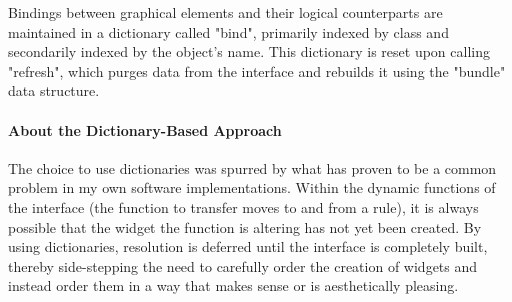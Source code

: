 Bindings between graphical elements and their logical counterparts
  are maintained in a dictionary called "bind", primarily indexed by class
  and secondarily indexed by the object's name.
This dictionary is reset upon calling "refresh",
  which purges data from the interface and rebuilds it using
  the "bundle" data structure.

\paragraph{About the Dictionary-Based Approach}
The choice to use dictionaries was spurred by
  what has proven to be a common problem in my own software implementations.
Within the dynamic functions of the interface
  (\eg the function to transfer moves to and from a rule),
  it is always possible that the widget the function is altering has not yet been created.
By using dictionaries, resolution is deferred until the interface is completely built,
  thereby side-stepping the need to carefully order the creation of widgets
  and instead order them in a way that makes sense or is aesthetically pleasing.

